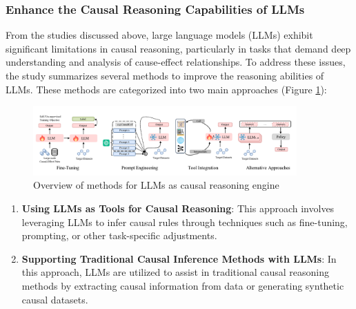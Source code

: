 \subsubsection{Enhance the Causal Reasoning Capabilities of LLMs}
From the studies discussed above, large language models (LLMs) exhibit significant limitations in causal reasoning, particularly in tasks that demand deep understanding and analysis of cause-effect relationships.
To address these issues, the study \cite{xiong2024improving} summarizes several methods to improve the reasoning abilities of LLMs. These methods are categorized into two main approaches (Figure \ref{fig:causal_method}):

\begin{figure}
    \centering
    \includegraphics[width=0.9\textwidth]{Figs/causal_method.png}
    \caption{Overview of methods for LLMs as causal reasoning engine}
    \label{fig:causal_method}
\end{figure}


\begin{enumerate}
    \item \textbf{Using LLMs as Tools for Causal Reasoning}: This approach involves leveraging LLMs to infer causal rules through techniques such as fine-tuning, prompting, or other task-specific adjustments.
    \item \textbf{Supporting Traditional Causal Inference Methods with LLMs}: In this approach, LLMs are utilized to assist in traditional causal reasoning methods by extracting causal information from data or generating synthetic causal datasets.
\end{enumerate}

